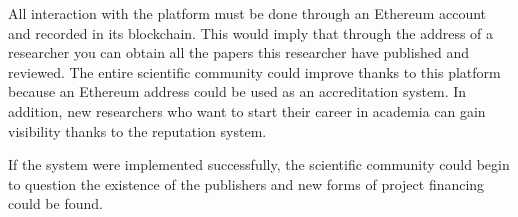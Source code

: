 All interaction with the platform must be done through an Ethereum account and
recorded in its blockchain. This would imply that through the address of a
researcher you can obtain all the papers this researcher have published and
reviewed. The entire scientific community could improve thanks to this platform
because an Ethereum address could be used as an accreditation system. In
addition, new researchers who want to start their career in academia can gain
visibility thanks to the reputation system.

If the system were implemented successfully, the scientific community could
begin to question the existence of the publishers and new
forms of project financing could be found.




